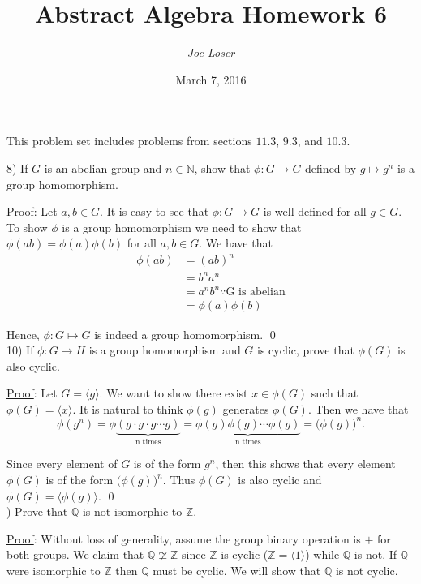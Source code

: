 \documentclass{article}
\title{Abstract Algebra Homework 6}
\author{\textit{Joe Loser}}
\date{March 7, 2016}
\begin{document}
\maketitle

This problem set includes problems from sections $11.3$, $9.3$, and $10.3$.

8) If $G$ is an abelian group and $n \in \mathbb{N}$, show that $\phi : G \to G$ defined by $g \mapsto g^{n}$ is a group homomorphism. 

\underline{Proof}: Let $a, b \in G$. It is easy to see that $\phi : G \to G$ is well-defined for all $g \in G$. To show $\phi$ is a group homomorphism we need to show that $\phi(ab) = \phi(a)\phi(b)$ for all $a, b \in G$. We have that
\begin{align*}
	\phi(ab) &= (ab)^{n} \\
	&= b^{n}a^{n} \\
	&= a^{n}b^n \because{\text{G is abelian}} \\
	&= \phi(a)\phi(b)
\end{align*}

Hence, $\phi : G \mapsto G$ is indeed a group homomorphism. \qed \\

10) If $\phi : G \to H$ is a group homomorphism and $G$ is cyclic, prove that $\phi(G)$ is also cyclic.

\underline{Proof}: Let $G = \langle g \rangle$. We want to show there exist $x \in \phi(G)$ such that $\phi(G) = \langle x \rangle$. It is natural to think $\phi(g)$ generates $\phi(G)$. Then we have that
$$\phi(g^n) = \phi\underbrace{(g \cdot g \cdot g \cdots g)}_{\text{n times}} = \underbrace{\phi(g)\phi(g) \cdots \phi(g)}_{\text{n times}} = \big(\phi(g)\big)^n.$$

Since every element of $G$ is of the form $g^{n}$, then this shows that every element $\phi(G)$ is of the form $\big(\phi(g)\big)^n$. Thus $\phi(G)$ is also cyclic and $\phi(G) = \langle \phi(g) \rangle$. \qed \\

) Prove that $\mathbb{Q}$ is not isomorphic to $\mathbb{Z}$. 

\underline{Proof}: Without loss of generality, assume the group binary operation is $+$ for both groups. We claim that $\mathbb{Q} \not \cong \mathbb{Z}$  since $\mathbb{Z}$ is cyclic ($\mathbb{Z} = \langle 1 \rangle$) while $\mathbb{Q}$ is not. If $\mathbb{Q}$ were isomorphic to $\mathbb{Z}$ then $\mathbb{Q}$ must be cyclic. We will show that $\mathbb{Q}$ is not cyclic. 
\end{document}

